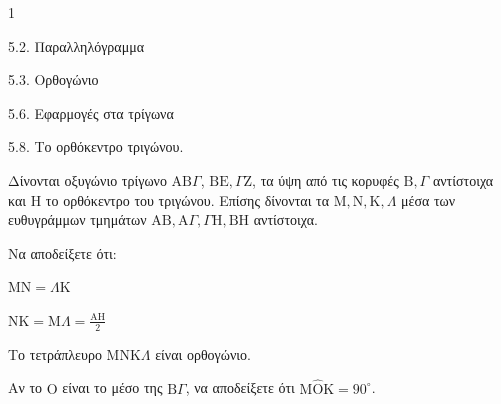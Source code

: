 \begin{ylh}{1}
    \item 5.2. Παραλληλόγραμμα
    \item 5.3. Ορθογώνιο
    \item 5.6. Εφαρμογές στα τρίγωνα
    \item 5.8. Το ορθόκεντρο τριγώνου.
\end{ylh}
Δίνονται οξυγώνιο τρίγωνο $\mathrm{A}\mathrm{B}\Gamma$, $\mathrm{B}\mathrm{E}, \Gamma\mathrm{Z}$, τα ύψη από τις κορυφές $\mathrm{B}, \Gamma$ αντίστοιχα και $\mathrm{H}$ το ορθόκεντρο του τριγώνου. Επίσης δίνονται τα $\mathrm{M}, \mathrm{N}, \mathrm{K}, \Lambda$ μέσα των ευθυγράμμων τμημάτων $\mathrm{A}\mathrm{B}, \mathrm{A}\Gamma, \Gamma\mathrm{H}, \mathrm{B}\mathrm{H}$ αντίστοιχα.
\begin{alist}
    \item Να αποδείξετε ότι:
    \begin{rlist}
        \item $\mathrm{M}\mathrm{N} = \Lambda\mathrm{K}$ 
        \item $\mathrm{N}\mathrm{K} = \mathrm{M}\Lambda = \frac{\mathrm{A}\mathrm{H}}{2}$ 
        \item Το τετράπλευρο $\mathrm{M}\mathrm{N}\mathrm{K}\Lambda$ είναι ορθογώνιο. 
    \end{rlist}
    \item Αν το $\mathrm{O}$ είναι το μέσο της $\mathrm{B}\Gamma$, να αποδείξετε ότι $\mathrm{M}\hat{\mathrm{O}}\mathrm{K} = 90^\circ$. 
\end{alist}
